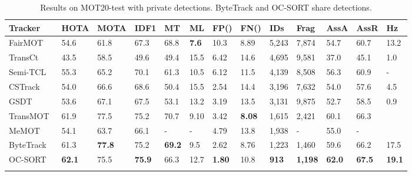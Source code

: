 \documentclass[10pt,twocolumn,letterpaper]{article}
\newcommand*{\aboverulesepcolor}[1]{\noalign{\begingroup 
      \color{#1}\hrule height\aboverulesep 
    \endgroup 
    \kern-\aboverulesep 
  }}
\begin{document}
\begin{table*}[hbt!]
\centering
\caption{Results on MOT20-test with private detections. ByteTrack and OC-SORT share detections.}
\setlength{\tabcolsep}{7pt}
\scriptsize
\begin{tabular}{ l | p{20px}p{20px}p{20px}HHp{27px} p{27px}p{22px}p{22px}p{20px}p{20px} H}

\toprule
Tracker & HOTA & MOTA & IDF1  & MT & ML &  FP({\footnotesize }) & FN({\footnotesize }) & IDs & Frag & AssA & AssR & Hz\\
\midrule
FairMOT~\cite{zhang2021fairmot} & 54.6 & 61.8 & 67.3 & 68.8  & \textbf{7.6 } & 10.3 & 8.89 & 5,243 & 7,874 & 54.7 & 60.7 &  13.2\\
TransCt~\cite{transcenter} & 43.5 & 58.5 & 49.6 & 49.4  & 15.5  & 6.42 & 14.6 & 4,695 & 9,581 & 37.0 & 45.1 & 1.0\\
Semi-TCL~\cite{li2021semitcl} & 55.3 & 65.2 & 70.1 & 61.3  & 10.5  & 6.12 & 11.5 & 4,139 & 8,508 & 56.3 & 60.9 & -\\
CSTrack~\cite{cstrack} & 54.0 & 66.6 & 68.6  & 50.4  & 15.5  & 2.54 & 14.4 & 3,196 & 7,632 &  54.0 & 57.6 & 4.5\\
GSDT~\cite{gsdt} & 53.6 & 67.1 & 67.5  & 53.1  & 13.2  & 3.19 & 13.5 & 3,131 & 9,875 & 52.7 & 58.5 & 0.9\\
TransMOT~\cite{chu2021transmot} & 61.9 & 77.5 & 75.2 & 70.7 & 9.10 & 3.42 & \textbf{8.08} &   1,615 & 2,421 & 60.1 & 66.3 \\
MeMOT~\cite{cai2022memot} & 54.1 & 63.7 & 66.1 & - & - & 4.79 &  13.8 & 1,938 & - & 55.0 & -\\ 
ByteTrack~\cite{bytetrack} & 61.3 & \textbf{77.8} & 75.2 & \textbf{69.2 } & 9.5  & 2.62 & 8.76 & 1,223 & 1,460 & 59.6 & 66.2 & 17.5\\
OC-SORT & \textbf{62.1} & 75.5 & \textbf{75.9} & 66.3 & 12.7 & \textbf{1.80} & 10.8 & \textbf{913} & \textbf{1,198}& \textbf{62.0} & \textbf{67.5} & \textbf{19.1} \\
\aboverulesepcolor{babyblue!20}
\bottomrule
\end{tabular}
\label{table:mot20}
\vspace{-0.2cm}
\end{table*}
\end{document}

